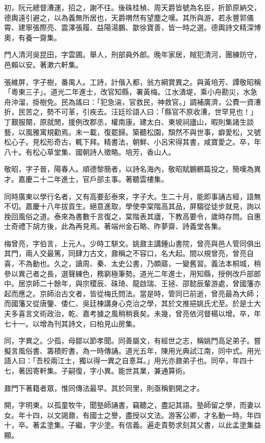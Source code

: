 \begin{pinyinscope}
初，阮元總督漕運，招之，謝不往。後硃桂楨、周天爵皆號為名臣，折節原納交，德輿遠引避之，以為義無所居也，天爵喟然有望塵之嘆。其所與游，若永豐郭儀霄、建寧張際亮、震澤張履、益陽湯鵬、歙徐寶善，皆一時之選。德輿詩文精深博奧，有養一齋集。

門人清河吳昆田，字雲圃。舉人，刑部員外郎。晚年家居，賊犯清河，團練防守，邑賴以安。著漱六軒集。

張維屏，字子樹，番禺人。工詩，計偕入都，翁方綱賞異之。與黃培芳、譚敬昭稱「粵東三子」。道光二年進士，改官知縣，署黃梅。江水潰堤，乘小舟勘災，水急舟沖溜，掛樹免。民為謠曰：「犯急湍，官救民，神救官。」調補廣濟，公費一資漕折，民苦之，勢不可革，引疾去。汪廷珍語人曰：「縣官不原收漕，世罕見也！」丁艱服闋，原就閒，援例改郡丞，權南康。建太白、東坡祠廬山，暇則集諸生談藝，以風雅寓規勸焉。未一載，復罷歸。築聽松園，頹然不與世事，癖愛松，又號松心子。見松形奇古，輒下拜。精書法，朝鮮、小呂宋得其書，咸寶愛之。卒，年八十。有松心草堂集、國朝詩人徵略。培芳，香山人。

敬昭，字子晉，陽春人。順德黎簡者，以詩名海內，敬昭賦鵬鶴篇投之，簡嘆為異才。嘉慶二十二年進士，官戶部主事。著聽雲樓集。

同時廣東以學行名者，又有高要彭泰來，字子大。生二十月，能即事誦古經，語無不切。嘉慶十八年拔貢生。絕意進取，學使李棠階高其品，屏騶從徒步就見，詢以挽回風俗之道。泰來為書數千言復之，棠階表其廬，下教高要令，歲時存問。自惠士奇禮下胡方後，此為再見焉。著端州金石略、昨夢齋、詩義堂各集。

梅曾亮，字伯言，上元人。少時工駢文。姚鼐主講鍾山書院，曾亮與邑人管同俱出其門，兩人交最篤，同肆力古文，鼐稱之不容口，名大起。間以規曾亮，曾亮自喜，不為動也。久之，讀周、秦、太史公書，乃頗寤，一變舊習。義法本桐城，稍參以異己者之長，選聲練色，務窮極筆勢。道光二年進士，用知縣，授例改戶部郎中。居京師二十餘年，與宗稷辰、硃琦、龍啟瑞、王拯、邵懿辰輩游處，曾國籓亦起而應之。京師治古文者，皆從梅氏問法。當是時，管同已前逝，曾亮最為大師；而國籓又從唐鑒、倭仁、吳廷棟講身心克治之學，其於文推挹姚氏尤至。於是士大夫多喜言文術政治，乾、嘉考據之風稍稍衰矣。未幾，曾亮依河督楊以增。卒，年七十一。以增為刊其詩文，曰柏見山房集。

同，字異之。少孤，母鄒以節孝聞。同善屬文，有經世之志，稱姚門高足弟子。嘗擬言風俗書、籌積貯書，為一時傳誦。道光五年，陳用光典試江南，同中式。用光語人曰：「吾校兩江士，獨以得一異之自憙耳。」用光亦鼐弟子也。同卒，年四十七，著因寄軒集。子嗣復，字小異。能世其業，兼通算術。

鼐門下著籍者眾，惟同傳法最早。其於同里，則亟稱劉開之才。

開，字明東。以孤童牧牛，聞塾師誦書，竊聽之，盡記其語。塾師留之學，而妻以女。年十四，以文謁鼐，有國士之譽，盡授以文法。游客公卿，才名動一時。年四十，卒。著孟塗集。子繼，字少塗。有信義。遍走貴勢求刻其父書，以此孟塗集益顯。


\end{pinyinscope}

